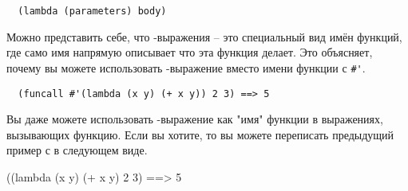 \begin{lstlisting}
  (lambda (parameters) body)
\end{lstlisting}

Можно представить себе, что -выражения -- это специальный вид имён функций,
где само имя напрямую описывает что эта функция делает.  Это объясняет, почему вы можете
использовать -выражение вместо имени функции с \lstinline!#'!.

\begin{verbatim}
  (funcall #'(lambda (x y) (+ x y)) 2 3) ==> 5
\end{verbatim}

Вы даже можете использовать -выражение как "имя" функции в выражениях,
вызывающих функцию.  Если вы хотите, то вы можете переписать предыдущий пример с
 в следующем виде.

  ((lambda (x y) (+ x y) 2 3) ==> 5

